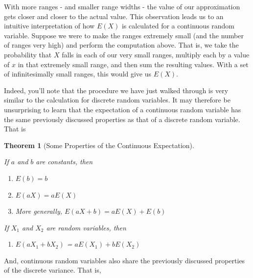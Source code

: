 \documentclass[
]{book}
\providecommand{\tightlist}{%
  \setlength{\itemsep}{0pt}\setlength{\parskip}{0pt}}
\newtheorem{theorem}{Theorem}[chapter]
\theoremstyle{definition}
\theoremstyle{definition}
\theoremstyle{definition}
\theoremstyle{definition}
\theoremstyle{remark}
\begin{document}
\renewcommand*{\arraystretch}{1}

With more ranges - and smaller range widths - the value of our approximation gets closer and closer to the actual value. This observation leads us to an intuitive interpretation of how \(E(X)\) is calculated for a continuous random variable. Suppose we were to make the ranges extremely small (and the number of ranges very high) and perform the computation above. That is, we take the probability that \(X\) falls in each of our very small ranges, multiply each by a value of \(x\) in that extremely small range, and then sum the resulting values. With a set of infinitesimally small ranges, this would give us \(E(X)\).

Indeed, you'll note that the procedure we have just walked through is very similar to the calculation for discrete random variables. It may therefore be unsurprising to learn that the expectation of a continuous random variable has the same previously discussed properties as that of a discrete random variable. That is

\begin{theorem}[Some Properties of the Continuous Expectation]
\protect\hypertarget{thm:expcont}{}\label{thm:expcont}

If \(a\) and \(b\) are constants, then

\begin{enumerate}
\def\labelenumi{\arabic{enumi}.}
\item
  \(E(b) = b\)
\item
  \(E(aX) = aE(X)\)
\item
  More generally, \(E(aX + b) = aE(X) + E(b)\)
\end{enumerate}

If \(X_1\) and \(X_2\) are random variables, then

\begin{enumerate}
\def\labelenumi{\arabic{enumi}.}
\setcounter{enumi}{3}
\tightlist
\item
  \(E(aX_1 + bX_2)\) = \(aE(X_1) + bE(X_2)\)
\end{enumerate}

\end{theorem}

And, continuous random variables also share the previously discussed properties of the discrete variance. That is,
\end{document}
